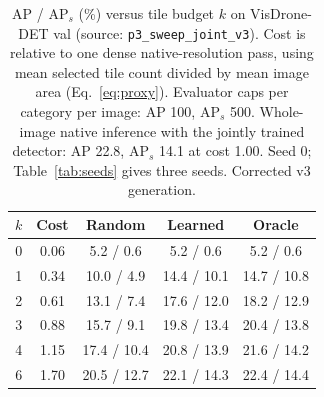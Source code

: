 \begin{table}[t]
\caption{AP / AP$_s$ (\%) versus tile budget $k$ on VisDrone-DET val (source: \texttt{p3\_sweep\_joint\_v3}). Cost is relative to one dense native-resolution pass, using mean selected tile count divided by mean image area (Eq.~\eqref{eq:proxy}). Evaluator caps per category per image: AP 100, AP$_s$ 500. Whole-image native inference with the jointly trained detector: AP 22.8, AP$_s$ 14.1 at cost 1.00. Seed 0; Table~\ref{tab:seeds} gives three seeds. Corrected v3 generation.}
\label{tab:curve}
\centering
\begin{tabular}{ccccc}
\toprule
$k$ & Cost & Random & Learned & Oracle \\
\midrule
0 & 0.06 & 5.2 / 0.6 & 5.2 / 0.6 & 5.2 / 0.6 \\
1 & 0.34 & 10.0 / 4.9 & 14.4 / 10.1 & 14.7 / 10.8 \\
2 & 0.61 & 13.1 / 7.4 & 17.6 / 12.0 & 18.2 / 12.9 \\
3 & 0.88 & 15.7 / 9.1 & 19.8 / 13.4 & 20.4 / 13.8 \\
4 & 1.15 & 17.4 / 10.4 & 20.8 / 13.9 & 21.6 / 14.2 \\
6 & 1.70 & 20.5 / 12.7 & 22.1 / 14.3 & 22.4 / 14.4 \\
\bottomrule
\end{tabular}
\end{table}
